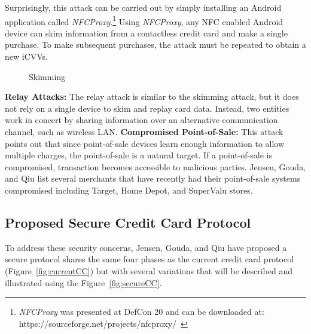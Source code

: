\documentclass{sig-alternate}
\begin{document}
Surprisingly, this attack can be carried out by simply installing an Android application called \textit{NFCProxy}.\footnote{\textit{NFCProxy} was presented at DefCon 20 and can be downloaded at: https://sourceforge.net/projects/nfcproxy/~\cite{CC2016}}
Using \textit{NFCProxy}, any NFC enabled Android device can skim information from a contactless credit card and make a single purchase. To make subsequent purchases, the attack must be repeated to obtain a new iCVVs.
\begin{figure}
\centering
{}
\caption{Skimming~\cite{CC2016}}
\label{fig:skim}
\end{figure} 
\vspace{2mm}\newline
\noindent\textbf{Relay Attacks:}
The relay attack is similar to the skimming attack, but it does not rely on a single device to skim and replay card data. Instead, two entities work in concert by sharing information over an alternative communication channel, such as wireless LAN.
\vspace{2mm}\newline
\noindent\textbf{Compromised Point-of-Sale:}
This attack points out that since point-of-sale devices learn enough information to allow multiple charges, the point-of-sale is a natural target. If a point-of-sale is compromised, transaction becomes accessible to malicious parties. Jensen, Gouda, and Qiu list several merchants that have recently had their point-of-sale systems compromised including Target, Home Depot, and SuperValu stores.

\subsection{Proposed Secure Credit Card Protocol}
To address these security concerns, Jensen, Gouda, and Qiu have proposed a secure protocol shares the same four phases as the current credit card protocol (Figure~\ref{fig:currentCC}) but with several variations that will be described and illustrated using the Figure~\ref{fig:secureCC}. 
\end{document}
